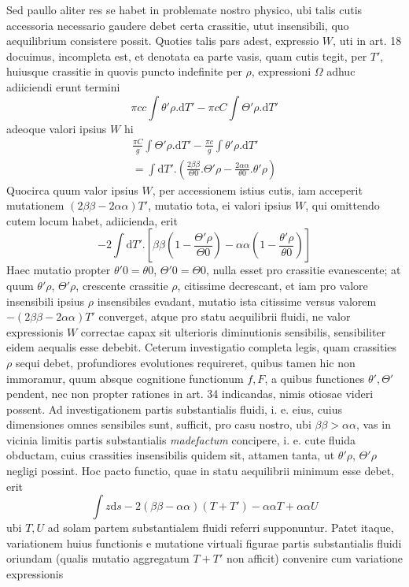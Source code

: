 Sed paullo aliter res se habet in problemate nostro physico, ubi talis cutis accessoria necessario gaudere debet certa crassitie, utut insensibili, quo aequilibrium consistere possit. Quoties talis pars adest, expressio $W$, uti in art. 18 docuimus, incompleta est, et denotata ea parte vasis, quam cutis tegit, per $T'$,
huiusque crassitie in quovis puncto indefinite per $\rho$, expressioni $\Omega$ adhuc adiiciendi erunt termini
\[
\pi cc\int\theta'\rho.\mathrm{d}T'-\pi cC\int\Theta'\rho.\mathrm{d}T'
\]
adeoque valori ipsius $W$ hi
\[
\begin{gathered}
\frac{\pi C}g\int\Theta'\rho.\mathrm{d}T'-\frac{\pi c}g\int\theta'\rho.\mathrm{d}T'\\
=\int\mathrm{d}T'.\left(\frac{2\beta\beta}{\Theta0}.\Theta'\rho-\frac{2\alpha\alpha}{\theta0}.\theta'\rho\right)
\end{gathered}
\]
Quocirca quum valor ipsius $W$, per accessionem istius cutis, iam acceperit mutationem $(2\beta\beta-2\alpha\alpha)T'$, mutatio tota, ei valori ipsius $W$, qui omittendo cutem locum habet, adiicienda, erit
\[
-2\int\mathrm{d}T'.\left[\beta\beta\left(1-\frac{\Theta'\rho}{\Theta0}\right)-\alpha\alpha\left(1-\frac{\theta'\rho}{\theta0}\right)\right]
\]
Haec mutatio propter $\theta'0=\theta0$, $\Theta'0=\Theta0$, nulla esset pro crassitie evanescente; at quum $\theta'\rho$, $\Theta'\rho$, crescente crassitie $\rho$, citissime decrescant, et iam pro valore insensibili ipsius $\rho$ insensibiles evadant, mutatio ista citissime versus valorem $-(2\beta\beta-2\alpha\alpha)T'$ converget, atque pro statu aequilibrii fluidi, ne valor expressionis $W$ correctae capax sit ulterioris diminutionis sensibilis, sensibiliter eidem aequalis esse debebit. Ceterum investigatio completa legis, quam crassities $\rho$ sequi debet, profundiores evolutiones requireret, quibus tamen hic non immoramur, quum absque cognitione functionum $f,F$, a quibus functiones $\theta',\Theta'$ pendent, nec non propter rationes in art. 34 indicandas, nimis otiosae videri possent. Ad investigationem partis substantialis fluidi, i. e. eius, cuius dimensiones omnes sensibiles sunt, sufficit, pro casu nostro, ubi $\beta\beta>\alpha\alpha$, vas in vicinia limitis partis substantialis \textit{madefactum} concipere, i. e. cute fluida obductam, cuius crassities insensibilis quidem sit, attamen tanta, ut $\theta'\rho$, $\Theta'\rho$ negligi possint. Hoc pacto functio, quae in statu aequilibrii minimum esse debet, erit
\[
\int z\mathrm{d}s-2(\beta\beta-\alpha\alpha)(T+T')-\alpha\alpha T+\alpha\alpha U
\]
ubi $T,U$ ad solam partem substantialem fluidi referri supponuntur. Patet itaque, variationem huius functionis e mutatione virtuali figurae partis substantialis fluidi oriundam (qualis mutatio aggregatum $T+T'$ non afficit) convenire cum variatione expressionis
